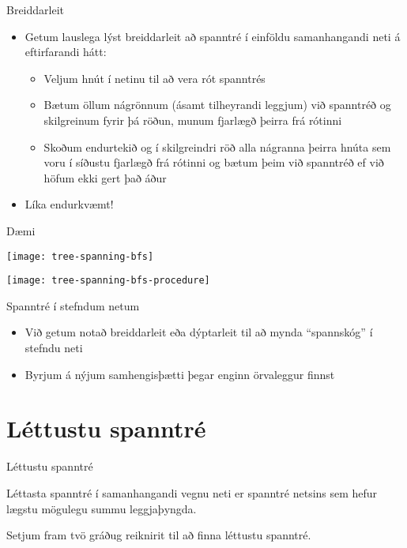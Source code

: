 \documentclass{beamer}
\begin{document}
\begin{frame}{Breiddarleit}
\begin{itemize}
 \item Getum lauslega lýst breiddarleit að spanntré í einföldu samanhangandi neti á eftirfarandi hátt:
 \begin{itemize}
  \item Veljum hnút í netinu til að vera rót spanntrés
  \item Bætum öllum nágrönnum (ásamt tilheyrandi leggjum) við spanntréð og skilgreinum fyrir þá röðun, munum fjarlægð þeirra frá rótinni
  \item Skoðum endurtekið og í skilgreindri röð alla nágranna þeirra hnúta sem voru í síðustu fjarlægð frá rótinni og bætum þeim við spanntréð ef við höfum ekki gert það áður
 \end{itemize}
 \item Líka endurkvæmt!
\end{itemize}
\end{frame}

\begin{frame}{Dæmi}
\begin{center}
\texttt{[image: tree-spanning-bfs]}

\pause
\texttt{[image: tree-spanning-bfs-procedure]}
\end{center}

\end{frame}

\begin{frame}{Spanntré í stefndum netum}
\begin{itemize}
 \item Við getum notað breiddarleit eða dýptarleit til að mynda ``spannskóg'' í stefndu neti
 \item Byrjum á nýjum samhengisþætti þegar enginn örvaleggur finnst
\end{itemize}
\end{frame}

\section{Léttustu spanntré}

\begin{frame}{Léttustu spanntré}
\begin{tcolorbox}[title=Léttustu spanntré]
Léttasta spanntré í samanhangandi vegnu neti er spanntré netsins sem hefur lægstu mögulegu summu leggjaþyngda.
\end{tcolorbox}
Setjum fram tvö gráðug reiknirit til að finna léttustu spanntré.
\end{frame}
\end{document}
